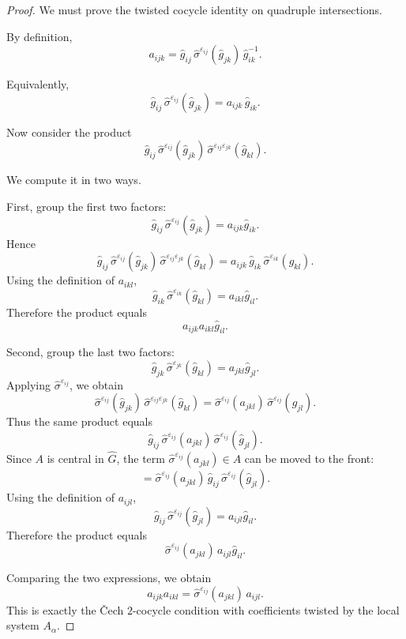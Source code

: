\documentclass[11pt]{amsart}
\begin{document}
\begin{proof}
We must prove the twisted cocycle identity on quadruple intersections.

By definition,
\[
a_{ijk}
=
\widehat g_{ij}\,
\widehat\sigma^{\varepsilon_{ij}}(\widehat g_{jk})\,
\widehat g_{ik}^{-1}.
\]

Equivalently,
\[
\widehat g_{ij}\,
\widehat\sigma^{\varepsilon_{ij}}(\widehat g_{jk})
=
a_{ijk}\,\widehat g_{ik}.
\]

Now consider the product
\[
\widehat g_{ij}\,
\widehat\sigma^{\varepsilon_{ij}}(\widehat g_{jk})\,
\widehat\sigma^{\varepsilon_{ij}\varepsilon_{jk}}(\widehat g_{kl}).
\]

We compute it in two ways.

First, group the first two factors:
\[
\widehat g_{ij}\,
\widehat\sigma^{\varepsilon_{ij}}(\widehat g_{jk})
=
a_{ijk}\widehat g_{ik}.
\]
Hence
\[
\widehat g_{ij}\,
\widehat\sigma^{\varepsilon_{ij}}(\widehat g_{jk})\,
\widehat\sigma^{\varepsilon_{ij}\varepsilon_{jk}}(\widehat g_{kl})
=
a_{ijk}\,
\widehat g_{ik}\,
\widehat\sigma^{\varepsilon_{ik}}(\widehat g_{kl}).
\]
Using the definition of \(a_{ikl}\),
\[
\widehat g_{ik}\,
\widehat\sigma^{\varepsilon_{ik}}(\widehat g_{kl})
=
a_{ikl}\widehat g_{il}.
\]
Therefore the product equals
\[
a_{ijk}a_{ikl}\widehat g_{il}.
\]

Second, group the last two factors:
\[
\widehat g_{jk}\,
\widehat\sigma^{\varepsilon_{jk}}(\widehat g_{kl})
=
a_{jkl}\widehat g_{jl}.
\]
Applying \(\widehat\sigma^{\varepsilon_{ij}}\), we obtain
\[
\widehat\sigma^{\varepsilon_{ij}}(\widehat g_{jk})\,
\widehat\sigma^{\varepsilon_{ij}\varepsilon_{jk}}(\widehat g_{kl})
=
\widehat\sigma^{\varepsilon_{ij}}(a_{jkl})\,
\widehat\sigma^{\varepsilon_{ij}}(\widehat g_{jl}).
\]
Thus the same product equals
\[
\widehat g_{ij}\,
\widehat\sigma^{\varepsilon_{ij}}(a_{jkl})\,
\widehat\sigma^{\varepsilon_{ij}}(\widehat g_{jl}).
\]
Since \(A\) is central in \(\widehat G\), the term
\(\widehat\sigma^{\varepsilon_{ij}}(a_{jkl})\in A\) can be moved to the front:
\[
=
\widehat\sigma^{\varepsilon_{ij}}(a_{jkl})\,
\widehat g_{ij}\,
\widehat\sigma^{\varepsilon_{ij}}(\widehat g_{jl}).
\]
Using the definition of \(a_{ijl}\),
\[
\widehat g_{ij}\,
\widehat\sigma^{\varepsilon_{ij}}(\widehat g_{jl})
=
a_{ijl}\widehat g_{il}.
\]
Therefore the product equals
\[
\widehat\sigma^{\varepsilon_{ij}}(a_{jkl})\,a_{ijl}\widehat g_{il}.
\]

Comparing the two expressions, we obtain
\[
a_{ijk}a_{ikl}
=
\widehat\sigma^{\varepsilon_{ij}}(a_{jkl})\,a_{ijl}.
\]
This is exactly the Čech \(2\)-cocycle condition with coefficients twisted by the local system \(A_\alpha\).
\end{proof}
\end{document}
